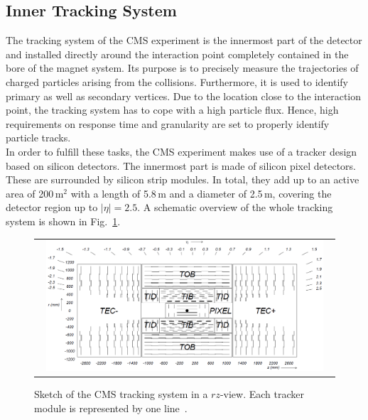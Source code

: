 \subsection{Inner Tracking System}
\label{subsec:cms_tracker}
The tracking system of the CMS experiment is the innermost part of the detector and installed directly around the interaction point completely contained in the bore of the magnet system. Its purpose is to precisely measure the trajectories of charged particles arising from the collisions. Furthermore, it is used to identify primary as well as secondary vertices. Due to the location close to the interaction point, the tracking system has to cope with a high particle flux. Hence, high requirements on response time and granularity are set to properly identify particle tracks. \\
In order to fulfill these tasks, the CMS experiment makes use of a tracker design based on silicon detectors. The innermost part is made of silicon pixel detectors. These are surrounded by silicon strip modules. In total, they add up to an active area of 200\,$\mathrm{m}^2$ with a length of 5.8\,m and a diameter of 2.5\,m, covering the detector region up to $|\eta| = 2.5$. A schematic overview of the whole tracking system is shown in Fig.~\ref{fig:CMS_tracker}. 
\begin{figure}[!tp]
  \centering
  \begin{tabular}{c}
    \includegraphics[width=0.95\textwidth]{figures/Figures_Experimental_Apparatus_Tracker.png}
  \end{tabular}
  \caption{Sketch of the CMS tracking system in a $rz$-view. Each tracker module is represented by one line~\cite{Chatrchyan:2008zzk}.}
  \label{fig:CMS_tracker}
\end{figure} 
